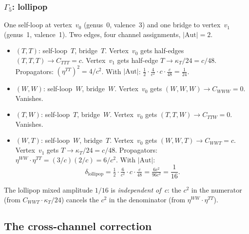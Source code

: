 \subsubsection*{$\Gamma_5$: lollipop}

One self-loop at vertex~$v_0$ (genus~0, valence~3) and one bridge
to vertex~$v_1$ (genus~1, valence~1). Two edges, four channel
assignments, $|\mathrm{Aut}| = 2$.

\begin{itemize}
\item \emph{$(T,T)$}: self-loop~$T$, bridge~$T$. Vertex~$v_0$ gets
 half-edges $(T,T,T) \to C_{TTT} = c$. Vertex~$v_1$ gets
 half-edge $T \to \kappa_T/24 = c/48$. Propagators:
 $(\eta^{TT})^2 = 4/c^2$. With $|\mathrm{Aut}|$:
 $\frac{1}{2} \cdot \frac{4}{c^2} \cdot c \cdot \frac{c}{48}
 = \frac{1}{24}$.

\item \emph{$(W,W)$}: self-loop~$W$, bridge~$W$. Vertex~$v_0$ gets
 $(W,W,W) \to C_{WWW} = 0$. Vanishes.

\item \emph{$(T,W)$}: self-loop~$T$, bridge~$W$. Vertex~$v_0$ gets
 $(T,T,W) \to C_{TTW} = 0$. Vanishes.

\item \emph{$(W,T)$}: self-loop~$W$, bridge~$T$. Vertex~$v_0$ gets
 $(W,W,T) \to C_{WWT} = c$. Vertex~$v_1$ gets
 $T \to \kappa_T/24 = c/48$. Propagators:
 $\eta^{WW} \cdot \eta^{TT} = (3/c)(2/c) = 6/c^2$.
 With $|\mathrm{Aut}|$:
 \begin{equation}\label{eq:lollipop-mixed}
 \delta_{\mathrm{lollipop}}
 = \tfrac{1}{2} \cdot \tfrac{6}{c^2} \cdot c \cdot \tfrac{c}{48}
 = \tfrac{6c^2}{96c^2} = \frac{1}{16}.
 \end{equation}
\end{itemize}
The lollipop mixed amplitude $1/16$ is \emph{independent of~$c$}:
the $c^2$ in the numerator (from $C_{WWT} \cdot \kappa_T/24$)
cancels the $c^2$ in the denominator (from $\eta^{WW} \cdot \eta^{TT}$).


\subsection{The cross-channel correction}
\label{subsec:cross-channel}

